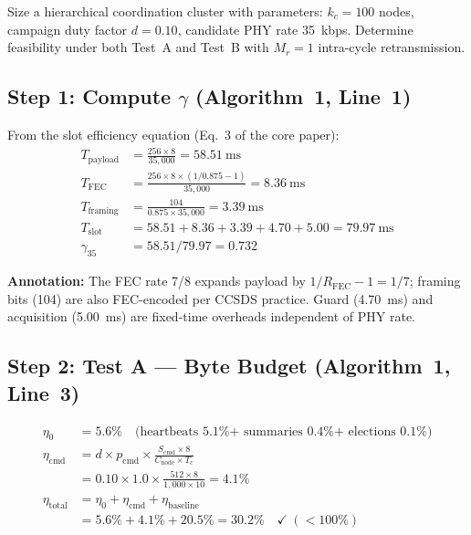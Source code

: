\documentclass[journal]{IEEEtran}
\begin{document}
Size a hierarchical coordination cluster with parameters: $k_c = 100$ nodes, campaign duty factor $d = 0.10$, candidate PHY rate 35~kbps. Determine feasibility under both Test~A and Test~B with $M_r = 1$ intra-cycle retransmission.

\subsection{Step 1: Compute $\gamma$ (Algorithm~1, Line~1)}

From the slot efficiency equation (Eq.~3 of the core paper):
\begin{align*}
    T_{\text{payload}} &= \frac{256 \times 8}{35{,}000} = 58.51~\text{ms} \\
    T_{\text{FEC}} &= \frac{256 \times 8 \times (1/0.875 - 1)}{35{,}000} = 8.36~\text{ms} \\
    T_{\text{framing}} &= \frac{104}{0.875 \times 35{,}000} = 3.39~\text{ms} \\
    T_{\text{slot}} &= 58.51 + 8.36 + 3.39 + 4.70 + 5.00 = 79.97~\text{ms} \\
    \gamma_{35} &= 58.51 / 79.97 = 0.732
\end{align*}

\textbf{Annotation:} The FEC rate 7/8 expands payload by $1/R_{\text{FEC}} - 1 = 1/7$; framing bits (104) are also FEC-encoded per CCSDS practice. Guard (4.70~ms) and acquisition (5.00~ms) are fixed-time overheads independent of PHY rate.

\subsection{Step 2: Test A --- Byte Budget (Algorithm~1, Line~3)}

\begin{align*}
    \eta_0 &= 5.6\% \quad \text{(heartbeats 5.1\% + summaries 0.4\% + elections 0.1\%)} \\
    \eta_{\text{cmd}} &= d \times p_{\text{cmd}} \times \frac{S_{\text{cmd}} \times 8}{C_{\text{node}} \times T_c} \\
                      &= 0.10 \times 1.0 \times \frac{512 \times 8}{1{,}000 \times 10} = 4.1\% \\
    \eta_{\text{total}} &= \eta_0 + \eta_{\text{cmd}} + \eta_{\text{baseline}} \\
                        &= 5.6\% + 4.1\% + 20.5\% = 30.2\% \quad \checkmark~(< 100\%)
\end{align*}
\end{document}
